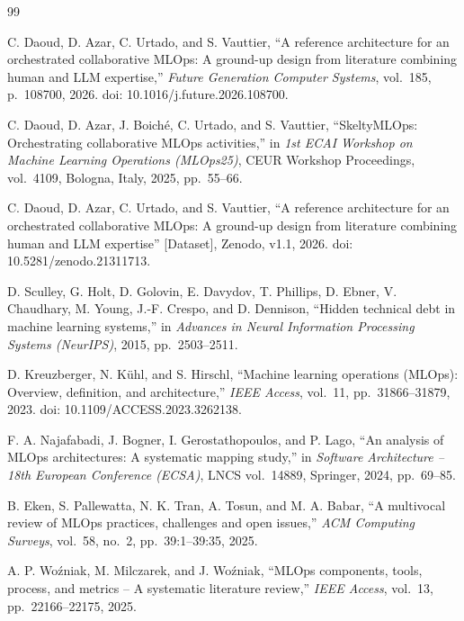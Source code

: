 \documentclass[11pt,a4paper]{article}
\begin{document}
\begin{thebibliography}{99}

 C. Daoud, D. Azar, C. Urtado, and S. Vauttier, ``A reference architecture for an orchestrated collaborative MLOps: A ground-up design from literature combining human and LLM expertise,'' \emph{Future Generation Computer Systems}, vol.~185, p.~108700, 2026. doi: 10.1016/j.future.2026.108700.

 C. Daoud, D. Azar, J. Boich\'e, C. Urtado, and S. Vauttier, ``SkeltyMLOps: Orchestrating collaborative MLOps activities,'' in \emph{1st ECAI Workshop on Machine Learning Operations (MLOps25)}, CEUR Workshop Proceedings, vol.~4109, Bologna, Italy, 2025, pp.~55--66.

 C. Daoud, D. Azar, C. Urtado, and S. Vauttier, ``A reference architecture for an orchestrated collaborative MLOps: A ground-up design from literature combining human and LLM expertise'' [Dataset], Zenodo, v1.1, 2026. doi: 10.5281/zenodo.21311713.

 D. Sculley, G. Holt, D. Golovin, E. Davydov, T. Phillips, D. Ebner, V. Chaudhary, M. Young, J.-F. Crespo, and D. Dennison, ``Hidden technical debt in machine learning systems,'' in \emph{Advances in Neural Information Processing Systems (NeurIPS)}, 2015, pp.~2503--2511.

 D. Kreuzberger, N. K\"uhl, and S. Hirschl, ``Machine learning operations (MLOps): Overview, definition, and architecture,'' \emph{IEEE Access}, vol.~11, pp.~31866--31879, 2023. doi: 10.1109/ACCESS.2023.3262138.

 F. A. Najafabadi, J. Bogner, I. Gerostathopoulos, and P. Lago, ``An analysis of MLOps architectures: A systematic mapping study,'' in \emph{Software Architecture -- 18th European Conference (ECSA)}, LNCS vol.~14889, Springer, 2024, pp.~69--85.

 B. Eken, S. Pallewatta, N. K. Tran, A. Tosun, and M. A. Babar, ``A multivocal review of MLOps practices, challenges and open issues,'' \emph{ACM Computing Surveys}, vol.~58, no.~2, pp.~39:1--39:35, 2025.

 A. P. Wo\'zniak, M. Milczarek, and J. Wo\'zniak, ``MLOps components, tools, process, and metrics -- A systematic literature review,'' \emph{IEEE Access}, vol.~13, pp.~22166--22175, 2025.


\end{thebibliography}
\end{document}
